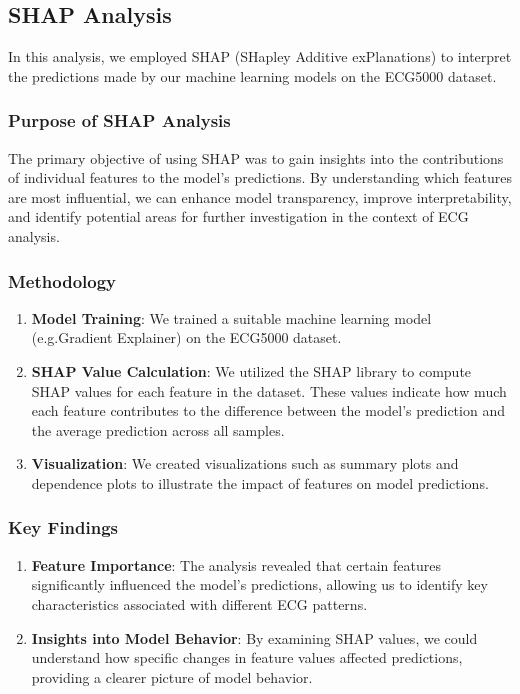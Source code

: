 \documentclass[nonacm,sigconf]{acmart}
\begin{document}
\subsection{SHAP Analysis}
In this analysis, we employed SHAP (SHapley Additive exPlanations) to interpret the predictions made by our machine learning models on the ECG5000 dataset.
\subsubsection{\textbf{Purpose of SHAP Analysis}}
The primary objective of using SHAP was to gain insights into the contributions of individual features to the model's predictions. By understanding which features are most influential, we can enhance model transparency, improve interpretability, and identify potential areas for further investigation in the context of ECG analysis.
\subsubsection{\textbf{
Methodology}}
\begin{enumerate} 
    \item \textbf{Model Training}: We trained a suitable machine learning model (e.g.Gradient Explainer) on the ECG5000 dataset.
    \item \textbf{SHAP Value Calculation}: We utilized the SHAP library to compute SHAP values for each feature in the dataset. These values indicate how much each feature contributes to the difference between the model's prediction and the average prediction across all samples.
    \item \textbf{Visualization}: We created visualizations such as summary plots and dependence plots to illustrate the impact of features on model predictions.
\end{enumerate}
\subsubsection{\textbf{Key Findings}}

\begin{enumerate}
    \item \textbf{
    Feature Importance}: The analysis revealed that certain features significantly influenced the model's predictions, allowing us to identify key characteristics associated with different ECG patterns.
    
    \item \textbf{Insights into Model Behavior}: By examining SHAP values, we could understand how specific changes in feature values affected predictions, providing a clearer picture of model behavior.
    
\end{enumerate}
\end{document}
